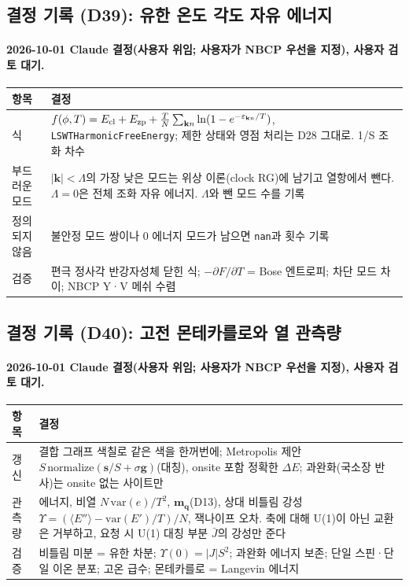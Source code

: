 \subsection{결정 기록 (D39): 유한 온도 각도 자유 에너지}\label{decisions-d39-free-energy}
\begingroup%
  \framesubtitle{2026-10-01 Claude 결정(사용자 위임; 사용자가 NBCP 우선을 지정), 사용자 검토 대기.}
  \small\renewcommand{\arraystretch}{1.12}
  \begin{tabularx}{\textwidth}{@{}P{3.0cm}Y@{}}
    \toprule
    항목 & 결정 \\
    \midrule
    식 & $f(\phi,T)=E_{\rm cl}+E_{\rm zp}+\frac{T}{N}\sum_{\mathbf k n}\ln(1-e^{-\varepsilon_{\mathbf k n}/T})$, \texttt{LSWTHarmonicFreeEnergy}; 제한 상태와 영점 처리는 D28 그대로. 1/S 조화 차수 \\
    부드러운 모드 & $|\mathbf k|<\Lambda$의 가장 낮은 모드는 위상 이론(clock RG)에 남기고 열항에서 뺀다. $\Lambda=0$은 전체 조화 자유 에너지. $\Lambda$와 뺀 모드 수를 기록 \\
    정의되지 않음 & 불안정 모드 쌍이나 0 에너지 모드가 남으면 \texttt{nan}과 횟수 기록 \\
    검증 & 편극 정사각 반강자성체 닫힌 식; $-\partial F/\partial T$ = Bose 엔트로피; 차단 모드 차이; NBCP Y·V 메쉬 수렴 \\
    \bottomrule
  \end{tabularx}
\endgroup


\subsection{결정 기록 (D40): 고전 몬테카를로와 열 관측량}\label{decisions-d40-monte-carlo}
\begingroup%
  \framesubtitle{2026-10-01 Claude 결정(사용자 위임; 사용자가 NBCP 우선을 지정), 사용자 검토 대기.}
  \small\renewcommand{\arraystretch}{1.12}
  \begin{tabularx}{\textwidth}{@{}P{3.0cm}Y@{}}
    \toprule
    항목 & 결정 \\
    \midrule
    갱신 & 결합 그래프 색칠로 같은 색을 한꺼번에; Metropolis 제안 $S\,\mathrm{normalize}(\mathbf s/S+\sigma\mathbf g)$(대칭), onsite 포함 정확한 $\Delta E$; 과완화(국소장 반사)는 onsite 없는 사이트만 \\
    관측량 & 에너지, 비열 $N\,\mathrm{var}(e)/T^2$, $\mathbf m_{\mathbf q}$(D13), 상대 비틀림 강성 $\Upsilon=(\langle E''\rangle-\mathrm{var}(E')/T)/N$, 잭나이프 오차. 축에 대해 U(1)이 아닌 교환은 거부하고, 요청 시 U(1) 대칭 부분 $\bar J$의 강성만 준다 \\
    검증 & 비틀림 미분 = 유한 차분; $\Upsilon(0)=|J|S^2$; 과완화 에너지 보존; 단일 스핀·단일 이온 분포; 고온 급수; 몬테카를로 = Langevin 에너지 \\
    \bottomrule
  \end{tabularx}
\endgroup


